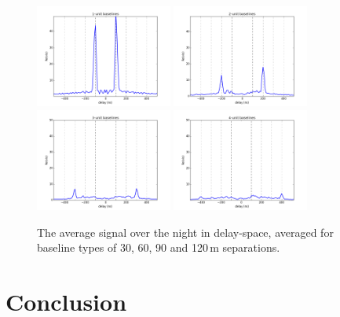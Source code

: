 \documentclass[10pt,a4paper,notitlepage]{article}
\begin{document}
\begin{figure}
\centering
\includegraphics[width=0.4\textwidth]{xx_1unit_xtalk_d.png}
\includegraphics[width=0.4\textwidth]{xx_2unit_xtalk_d.png}
\includegraphics[width=0.4\textwidth]{xx_3unit_xtalk_d.png}
\includegraphics[width=0.4\textwidth]{xx_4unit_xtalk_d.png}
\caption{The average signal over the night in delay-space, averaged for baseline types of 30, 60, 90 and 120\,m separations.}
\label{fig:the-money-plot}
\end{figure}


\section{Conclusion}
\end{document}
